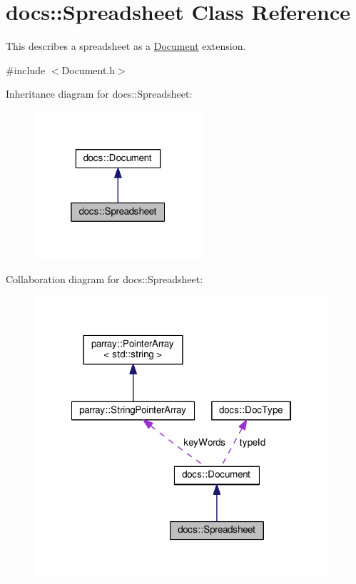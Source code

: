 \hypertarget{classdocs_1_1Spreadsheet}{\section{docs\-:\-:Spreadsheet Class Reference}
\label{classdocs_1_1Spreadsheet}
}


This describes a spreadsheet as a \hyperlink{classdocs_1_1Document}{Document} extension.  




{\ttfamily \#include $<$Document.\-h$>$}



Inheritance diagram for docs\-:\-:Spreadsheet\-:\nopagebreak
\begin{figure}[H]
\begin{center}
\leavevmode
\includegraphics[width=176pt]{classdocs_1_1Spreadsheet__inherit__graph}
\end{center}
\end{figure}


Collaboration diagram for docs\-:\-:Spreadsheet\-:\nopagebreak
\begin{figure}[H]
\begin{center}
\leavevmode
\includegraphics[width=309pt]{classdocs_1_1Spreadsheet__coll__graph}
\end{center}
\end{figure}
